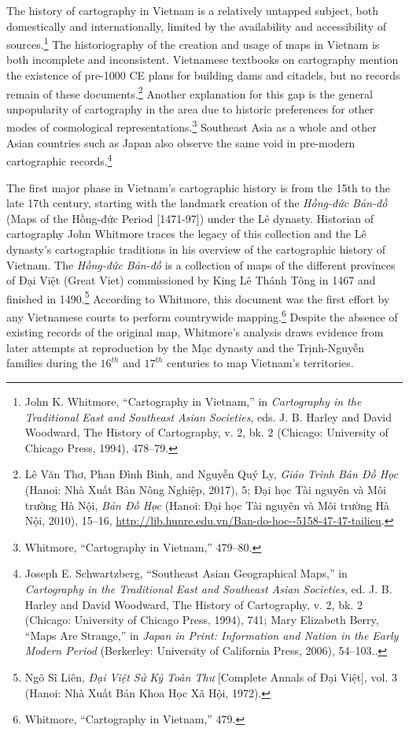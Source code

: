 The history of cartography in Vietnam is a relatively untapped subject, both domestically and internationally, limited by the availability and accessibility of sources.\footnote{John K. Whitmore, “Cartography in Vietnam,” in \textit{Cartography in the Traditional East and Southeast Asian Societies}, eds. J. B. Harley and David Woodward, The History of Cartography, v. 2, bk. 2 (Chicago: University of Chicago Press, 1994), 478–79.} The historiography of the creation and usage of maps in Vietnam is both incomplete and inconsistent. Vietnamese textbooks on cartography mention the existence of pre-1000 CE plans for building dams and citadels, but no records remain of these documents.\footnote{\vi Lê Văn Thơ, Phan Đình Binh, and Nguyễn Quý Ly, \textit{Giáo Trình Bản Đồ Học} (Hanoi: Nhà Xuất Bản Nông Nghiệp, 2017), 5; Đại học Tài nguyên và Môi trường Hà Nội, \textit{Bản Đồ Học} (Hanoi: Đại học Tài nguyên và Môi trường Hà Nội, 2010), 15–16, \url{http://lib.hunre.edu.vn/Ban-do-hoc--5158-47-47-tailieu}.}  Another explanation for this gap is the general unpopularity of cartography in the area due to historic preferences for other modes of cosmological representations.\footnote{Whitmore, “Cartography in Vietnam,” 479–80.} Southeast Asia as a whole and other Asian countries such as Japan also observe the same void in pre-modern cartographic records.\footnote{Joseph E. Schwartzberg, “Southeast Asian Geographical Maps,” in \textit{Cartography in the Traditional East and Southeast Asian Societies}, ed. J. B. Harley and David Woodward, The History of Cartography, v. 2, bk. 2 (Chicago: University of Chicago Press, 1994), 741; Mary Elizabeth Berry, “Maps Are Strange,” in \textit{Japan in Print: Information and Nation in the Early Modern Period} (Berkerley: University of California Press, 2006), 54–103..}

The first major phase in Vietnam’s cartographic history is from the 15th to the late 17th century, starting with the landmark creation of the \vi \textit{Hồng-đức Bản-đồ} (Maps of the Hồng-đức Period [1471-97]) under the Lê dynasty. Historian of cartography John Whitmore traces the legacy of this collection and the Lê dynasty’s cartographic traditions in his overview of the cartographic history of Vietnam. The \textit{Hồng-đức Bản-đồ} is a collection of maps of the different provinces of Đại Việt (Great Viet) commissioned by King Lê Thánh Tông in 1467 and finished in 1490.\footnote{Ngô Sĩ Liên, \textit{Đại Việt Sử Ký Toàn Thư} [Complete Annals of Đại Việt], vol. 3 (Hanoi: Nhà Xuất Bản Khoa Học Xã Hội, 1972).} According to Whitmore, this document was the first effort by any Vietnamese courts to perform countrywide mapping.\footnote{Whitmore, “Cartography in Vietnam,” 479.} Despite the absence of existing records of the original map, Whitmore’s analysis draws evidence from later attempts at reproduction by the Mạc dynasty and the Trịnh-Nguyễn families during the $16^{th}$ and $17^{th}$ centuries to map Vietnam’s territories.

